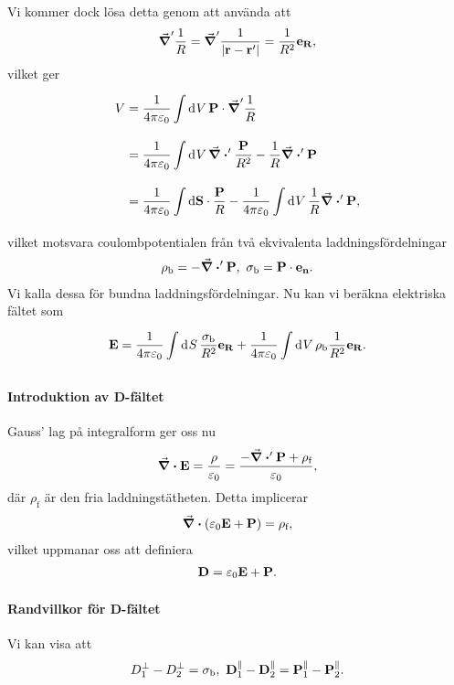 Vi kommer dock lösa detta genom att använda att
\begin{align*}
	\grad'{\frac{1}{R}} = \grad'{\frac{1}{\abs{\vb{r} - \vb{r}'}}} = \frac{1}{R^{2}}\vb{e}_{\vb{R}},
\end{align*}
vilket ger
\begin{align*}
	V &= \frac{1}{4\pi\varepsilon_{0}}\int\limits_{}^{}\dd[]{V}\vb{P}\cdot\grad'{\frac{1}{R}} \\
	  &= \frac{1}{4\pi\varepsilon_{0}}\int\limits_{}^{}\dd[]{V}\div'{\frac{\vb{P}}{R^{2}}} - \frac{1}{R}\div'{\vb{P}} \\
	  &= \frac{1}{4\pi\varepsilon_{0}}\int\limits_{}^{}\dd{\vb{S}}\cdot \frac{\vb{P}}{R} - \frac{1}{4\pi\varepsilon_{0}}\int\limits_{}^{}\dd[]{V}\frac{1}{R}\div'{\vb{P}},
\end{align*}
vilket motsvara coulombpotentialen från två ekvivalenta laddningsfördelningar
\begin{align*}
	\rho_{\text{b}} = -\div'{\vb{P}},\ \sigma_{\text{b}} = \vb{P}\cdot\vb{e}_{\vb{n}}.
\end{align*}
Vi kalla dessa för bundna laddningsfördelningar. Nu kan vi beräkna elektriska fältet som
\begin{align*}
	\vb{E} = \frac{1}{4\pi\varepsilon_{0}}\int\limits_{}^{}\dd[]{S}\frac{\sigma_{\text{b}}}{R^{2}}\vb{e}_{\vb{R}} + \frac{1}{4\pi\varepsilon_{0}}\int\limits_{}^{}\dd[]{V}\rho_{\text{b}}\frac{1}{R^{2}}\vb{e}_{\vb{R}}.
\end{align*}

\paragraph{Introduktion av D-fältet}
Gauss' lag på integralform ger oss nu
\begin{align*}
	\div{\vb{E}} = \frac{\rho}{\varepsilon_{0}} = \frac{-\div'{\vb{P}} + \rho_{\text{f}}}{\varepsilon_{0}},
\end{align*}
där $\rho_{\text{f}}$ är den fria laddningstätheten. Detta implicerar
\begin{align*}
	\div(\varepsilon_{0}\vb{E} + \vb{P}) = \rho_{\text{f}},
\end{align*}
vilket uppmanar oss att definiera
\begin{align*}
	\vb{D} = \varepsilon_{0}\vb{E} + \vb{P}.
\end{align*}

\paragraph{Randvillkor för D-fältet}
Vi kan visa att
\begin{align*}
	D_{1}^{\perp} - D_{2}^{\perp} = \sigma_{\text{b}},\ \vb{D}_{1}^{\parallel} - \vb{D}_{2}^{\parallel} = \vb{P}_{1}^{\parallel} - \vb{P}_{2}^{\parallel}.
\end{align*}

